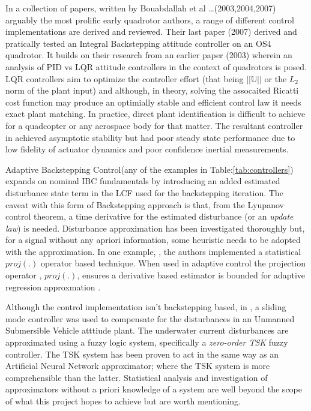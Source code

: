 \par
In a collection of papers, written by Bouabdallah et al \ldots (2003,2004,2007) arguably the most prolific early quadrotor authors, a range of different control implementations are derived and reviewed. Their last paper (2007)\cite{fullquadcoptercontrol} derived and pratically tested an Integral Backstepping attitude controller on an OS4 quadrotor. It builds on their research from an earlier paper (2003)\cite{pidlqr} wherein an analysis of PID vs LQR attitude controllers in the context of quadrotors is posed. LQR controllers aim to optimize the controller effort (that being $||\mathbb{U}||$ or the $L_2$ norm of the plant input) and although, in theory, solving the assocaited Ricatti cost function may produce an optimially stable and efficient control law it needs exact plant matching. In practice, direct plant identification is difficult to achieve for a quadcopter or any aerospace body for that matter. The resultant controller in \cite{pidlqr} achieved asymptotic stability but had poor steady state performance due to low fidelity of actuator dynamics and poor confidence inertial measurements.
\par
Adaptive Backstepping Control\cite{backstepping}(any of the examples in Table:\ref{tab:controllers}) expands on nominal IBC fundamentals by introducing an added estimated disturbance state term in the LCF used for the backstepping iteration. The caveat with this form of Backstepping approach is that, from the Lyupanov control theorem, a time derivative for the estimated disturbance (or an \emph{update law}) is needed. Disturbance approximation has been investigated thoroughly but, for a signal without any apriori information, some heuristic needs to be adopted with the approximation. In one example, \cite{nonlinearadaptive}, the authors implemented a statistical $proj(.)$ operator based technique. When used in adaptive control the projection operator \cite{outputfeedback}, $proj(.)$, ensures a derivative based estimator is bounded for adaptive regression approxmation \cite{nonlinearregression}.
\par
Although the control implementation isn't backstepping based, in \cite{adaptiveslidingmode}, a sliding mode controller was used to compensate for the disturbances in an Unmanned Submersible Vehicle atttiude plant. The underwater current disturbances are approximated using a fuzzy logic system, specifically a \emph{zero-order TSK} fuzzy controller. The TSK system has been proven to act in the same way as an Artificial Neural Network approximator\cite{zeroTSK}; where the TSK system is more comprehensible than the latter. Statistical analysis and investigation of approximators without a priori knowledge of a system are well beyond the scope of what this project hopes to achieve but are worth mentioning.

